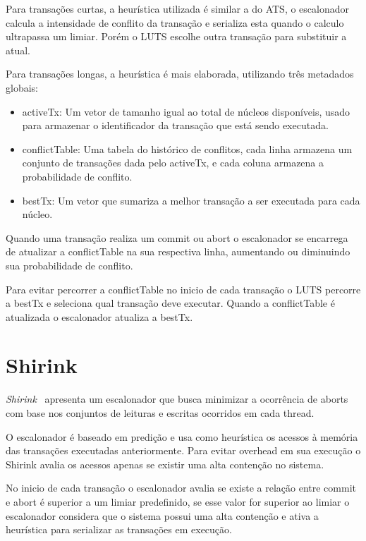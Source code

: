 \documentclass[diss,capa]{texufpel}
\begin{document}
Para transações curtas, a heurística utilizada é similar a do ATS, o escalonador calcula a intensidade de conflito da transação e serializa esta quando o calculo ultrapassa um limiar. Porém o LUTS escolhe outra transação para substituir a atual.

Para transações longas, a heurística é mais elaborada, utilizando três metadados globais:

\begin{itemize}
  \item  activeTx: Um vetor de tamanho igual ao total de núcleos disponíveis, usado para armazenar o identificador da transação que está sendo executada.
  \item conflictTable: Uma tabela do histórico de conflitos, cada linha armazena um conjunto de transações dada pelo activeTx, e cada coluna armazena a probabilidade de conflito.
  \item bestTx: Um vetor que sumariza a melhor transação a ser executada para cada núcleo.
\end{itemize}

Quando uma transação realiza um commit ou abort o escalonador se encarrega de atualizar a conflictTable na sua respectiva linha, aumentando ou diminuindo sua probabilidade de conflito.

Para evitar percorrer a conflictTable no inicio de cada transação o LUTS percorre a bestTx e seleciona qual transação deve executar. Quando a conflictTable é atualizada o escalonador atualiza a bestTx.

\section{Shirink}

\emph{Shirink}~\cite{shirink2009} apresenta um escalonador que busca minimizar a ocorrência de aborts com base nos conjuntos de leituras e escritas ocorridos em cada thread.

O escalonador é baseado em predição e usa como heurística os acessos à memória das transações executadas anteriormente. Para evitar overhead em sua execução o Shirink avalia os acessos apenas se existir uma alta contenção no sistema.

No inicio de cada transação o escalonador avalia se existe a relação entre commit e abort é superior a um limiar predefinido, se esse valor for superior ao limiar o escalonador considera que o sistema possui uma alta contenção e ativa a heurística para serializar as transações em execução.
\end{document}
